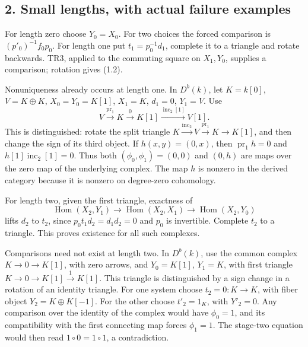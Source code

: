 \documentclass[11pt]{article}
\begin{document}
\subsection{\texorpdfstring{2. Small lengths,\allowbreak{} with actual failure examples}{2. Small  with actual failure examples}}\label{proofs-12008-12370-small-lengths-with-actual-failure-examples}

For length zero choose \(Y_0=X_0\). For two choices the forced comparison is \((p'_0)^{-1}f_0p_0\). For length one put \(t_1=p_0^{-1}d_1\),\allowbreak{} complete it to a triangle and rotate backwards. TR3,\allowbreak{} applied to the commuting square on \(X_1,Y_0\),\allowbreak{} supplies a comparison; rotation gives (1.2)\allowbreak{}.

Nonuniqueness already occurs at length one. In \(D^b(k)\),\allowbreak{} let \(K=k[0]\),\allowbreak{} \(V=K\oplus K\),\allowbreak{} \(X_0=Y_0=K[1]\),\allowbreak{} \(X_1=K\),\allowbreak{} \(d_1=0\),\allowbreak{} \(Y_1=V\). Use \[
V\xrightarrow{\operatorname{pr}_1}K\xrightarrow{0}K[1]
 \xrightarrow{\operatorname{inc}_2[1]}V[1]. \tag{2.1}
\] This is distinguished:\allowbreak{} rotate the split triangle \(K\xrightarrow{\operatorname{inc}_2}V\xrightarrow{\operatorname{pr}_1}K\to K[1]\),\allowbreak{} and then change the sign of its third object. If \(h(x,y)=(0,x)\),\allowbreak{} then \(\operatorname{pr}_1h=0\) and \(h[1]\operatorname{inc}_2[1]=0\). Thus both \((\phi_0,\phi_1)=(0,0)\) and \((0,h)\) are maps over the zero map of the underlying complex. The map \(h\) is nonzero in the derived category because it is nonzero on degree-zero cohomology.

For length two,\allowbreak{} given the first triangle,\allowbreak{} exactness of \[
\operatorname{Hom}(X_2,Y_1)\longrightarrow
\operatorname{Hom}(X_2,X_1)\longrightarrow
\operatorname{Hom}(X_2,Y_0)
\] lifts \(d_2\) to \(t_2\),\allowbreak{} since \(p_0t_1d_2=d_1d_2=0\) and \(p_0\) is invertible. Complete \(t_2\) to a triangle. This proves existence for all such complexes.

Comparisons need not exist at length two. In \(D^b(k)\),\allowbreak{} use the common complex \(K\to0\to K[1]\),\allowbreak{} with zero arrows,\allowbreak{} and \(Y_0=K[1]\),\allowbreak{} \(Y_1=K\),\allowbreak{} with first triangle \(K\to0\to K[1]\xrightarrow{1}K[1]\). This triangle is distinguished by a sign change in a rotation of an identity triangle. For one system choose \(t_2=0:K\to K\),\allowbreak{} with fiber object \(Y_2=K\oplus K[-1]\). For the other choose \(t'_2=1_K\),\allowbreak{} with \(Y'_2=0\). Any comparison over the identity of the complex would have \(\phi_0=1\),\allowbreak{} and its compatibility with the first connecting map forces \(\phi_1=1\). The stage-two equation would then read \(1\circ0=1\circ1\),\allowbreak{} a contradiction.
\end{document}
